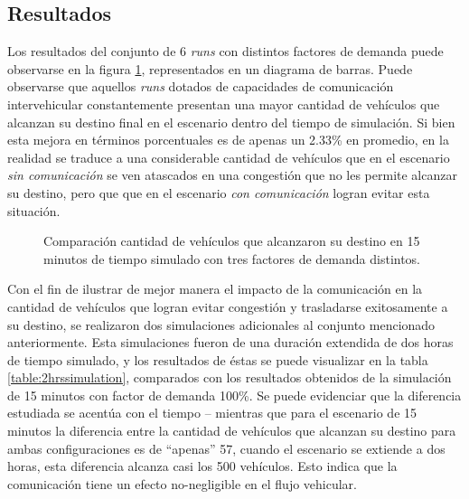 \subsection{Resultados}

Los resultados del conjunto de 6 \emph{runs} con distintos factores de demanda puede observarse en la figura \ref{fig:arrivedcomp}, representados en un diagrama de barras. Puede observarse que aquellos \emph{runs} dotados de capacidades de comunicación intervehicular constantemente presentan una mayor cantidad de vehículos que alcanzan su destino final en el escenario dentro del tiempo de simulación. Si bien esta mejora en términos porcentuales es de apenas un 2.33\% en promedio, en la realidad se traduce a una considerable cantidad de vehículos que en el escenario \emph{sin comunicación} se ven atascados en una congestión que no les permite alcanzar su destino, pero que que en el escenario \emph{con comunicación} logran evitar esta situación.

\begin{figure}[tpb]
    \centering
    
    \caption[Comparación cantidad de vehículos que alcanzaron su destino]{Comparación cantidad de vehículos que alcanzaron su destino en 15 minutos de tiempo simulado con tres factores de demanda distintos.}
    \label{fig:arrivedcomp}
\end{figure}

Con el fin de ilustrar de mejor manera el impacto de la comunicación en la cantidad de vehículos que logran evitar congestión y trasladarse exitosamente a su destino, se realizaron dos simulaciones adicionales al conjunto mencionado anteriormente. Esta simulaciones fueron de una duración extendida de dos horas de tiempo simulado, y los resultados de éstas se puede visualizar en la tabla \ref{table:2hrssimulation}, comparados con los resultados obtenidos de la simulación de 15 minutos con factor de demanda 100\%. Se puede evidenciar que la diferencia estudiada se acentúa con el tiempo -- mientras que para el escenario de 15 minutos la diferencia entre la cantidad de vehículos que alcanzan su destino para ambas configuraciones es de ``apenas'' 57, cuando el escenario se extiende a dos horas, esta diferencia alcanza casi los 500 vehículos. Esto indica que la comunicación tiene un efecto no-negligible en el flujo vehicular.

